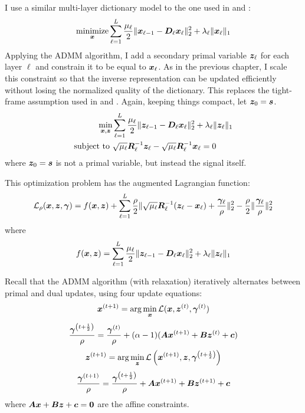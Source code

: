 I use a similar multi-layer dictionary model to the one used in \cite{murdock2018deep} and \cite{chodosh2018deep}:
%
\begin{equation}
\operatorname*{\text{minimize}}_{\bm{x}} \sum_{\ell = 1}^{L} \frac{\mu_{\ell}}{2}\|\bm{x}_{\ell - 1} -\bm{D}_{\ell}\bm{x}_{\ell}\|_2^2 + \lambda_{\ell}\|\bm{x}_{\ell}\|_1
\end{equation}
%
Applying the ADMM algorithm, I add a secondary primal variable $\bm{z}_{\ell}$ for each layer $\ell$ and constrain it to be equal to $\bm{x}_{\ell}$. As in the previous chapter, I scale this constraint so that the inverse representation can be updated efficiently without losing the normalized quality of the dictionary. This replaces the tight-frame assumption used in \cite{murdock2018deep} and \cite{chodosh2018deep}. Again, keeping things compact, let $\bm{z}_0 = \bm{s}$.
%
\begin{equation}
\begin{aligned}
\min_{\bm{x},\bm{z}} & \sum_{\ell = 1}^{L} \frac{\mu_{\ell}}{2}\|\bm{z}_{\ell - 1} -\bm{D}_{\ell}\bm{x}_{\ell}\|_2^2 + \lambda_{\ell}\|\bm{z}_{\ell}\|_1 \\
\text{subject to } & \sqrt{\mu_{\ell}}\bm{R}_{\ell}^{-1}\bm{z}_{\ell} - \sqrt{\mu_{\ell}}\bm{R}_{\ell}^{-1}\bm{x}_{\ell} = 0
\end{aligned}
\end{equation}
%
where $\bm{z}_0 = \bm{s}$ is not a primal variable, but instead the signal itself.

This optimization problem has the augmented Lagrangian function:
%
\begin{equation}
\mathcal{L}_{\rho}(\bm{x},\bm{z},\bm{\gamma}) = f(\bm{x},\bm{z})  +  \sum_{\ell = 1}^L \frac{\rho}{2}\|\sqrt{\mu_{\ell}}\bm{R}_{\ell}^{-1}(\bm{z}_{\ell} - \bm{x}_{\ell}) + \frac{\bm{\gamma}_{\ell}}{\rho}\|_2^2  - \frac{\rho}{2}\|\frac{\bm{\gamma}_{\ell}}{\rho}\|_2^2
\end{equation}
%
where 
\begin{equation}
f(\bm{x},\bm{z}) = \sum_{\ell = 1}^{L} \frac{\mu_{\ell}}{2}\|\bm{z}_{\ell - 1} -\bm{D}_{\ell}\bm{x}_{\ell}\|_2^2 + \lambda_{\ell}\|\bm{z}_{\ell}\|_1
\end{equation}

Recall that the ADMM algorithm (with relaxation) iteratively alternates between primal and dual updates, using four update equations:
\begin{equation} \label{equation:general x-update ADMM}
\bm{x}^{(t + 1)} = \arg\min_{\bm{x}} \mathcal{L}(\bm{x},\bm{z}^{(t)},\bm{\gamma}^{(t)})
\end{equation}
%
\begin{equation}
\frac{\bm{\gamma}^{\left(t + \frac{1}{2}\right)}}{\rho} = \frac{\bm{\gamma}^{(t)}}{\rho} + (\alpha - 1)(\bm{A}\bm{x}^{(t + 1)} + \bm{B}\bm{z}^{(t)} + \bm{c})
\end{equation}
%
\begin{equation} \label{equation:general y-update ADMM}
\bm{z}^{(t + 1)} = \arg\min_{\bm{z}} \mathcal{L}\left(\bm{x}^{(t + 1)},\bm{z},\bm{\gamma}^{\left(t + \frac{1}{2}\right)}\right)
\end{equation}
%
\begin{equation}
\frac{\bm{\gamma}^{(t + 1)}}{\rho} = \frac{\bm{\gamma}^{\left(t + \frac{1}{2}\right)}}{\rho} + \bm{A}\bm{x}^{(t + 1)} + \bm{B}\bm{z}^{(t + 1)} + \bm{c}
\end{equation}
%
where $\bm{A}\bm{x} + \bm{B}\bm{z} + \bm{c} = \bm{0}$ are the affine constraints.

